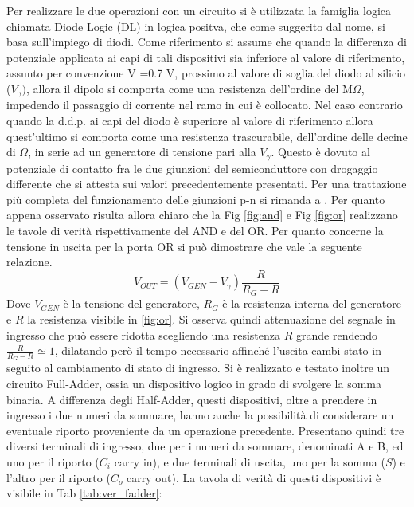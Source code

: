 \documentclass[a4paper,11pt]{article}
\begin{document}
	Per realizzare le due operazioni con un circuito si è utilizzata la famiglia logica chiamata Diode Logic (DL) in logica positva, che come suggerito dal nome, si basa sull'impiego di diodi. Come riferimento si assume che quando la differenza di potenziale applicata ai capi di tali dispositivi sia inferiore al valore di riferimento, assunto per convenzione V =0.7 V, prossimo al valore di soglia del diodo al silicio ($V_\gamma)$, allora   il dipolo si comporta come una resistenza dell'ordine del M$\Omega$, impedendo il passaggio di corrente nel ramo in cui è collocato. Nel caso contrario quando la d.d.p. ai capi del diodo è superiore al valore di riferimento allora quest'ultimo si comporta come una resistenza trascurabile, dell'ordine delle decine di $\Omega$, in serie ad un generatore di tensione pari alla $V_\gamma$. Questo è dovuto al potenziale di contatto fra le due giunzioni del semiconduttore con drogaggio differente che si attesta sui valori precedentemente presentati. Per una trattazione più completa del funzionamento delle giunzioni p-n si rimanda a \cite{6773080}. Per quanto appena osservato risulta allora chiaro che la Fig \ref{fig:and} e Fig \ref{fig:or} realizzano le tavole di verità rispettivamente del AND e del OR.
	Per quanto concerne la tensione in uscita per la porta OR si può dimostrare che vale la seguente relazione.
	\begin{equation}
		V_{OUT} = (V_{GEN}- V_\gamma) \frac{R}{R_G-R}
		\label{eq:v_out}
	\end{equation}
	Dove $V_{GEN}$ è la tensione del generatore, $R_G$ è la resistenza interna del generatore e $R$ la resistenza visibile in \ref{fig:or}. Si osserva quindi attenuazione del segnale in ingresso che può essere ridotta scegliendo una resistenza $R$ grande rendendo $\frac{R}{R_G-R} \simeq1$, dilatando però il tempo necessario affinché l'uscita cambi stato in seguito al cambiamento di stato di ingresso.
	Si è realizzato e testato inoltre un circuito Full-Adder, ossia un dispositivo logico in grado di svolgere la somma binaria. A differenza degli Half-Adder, questi dispositivi, oltre a prendere in ingresso i due numeri da sommare, hanno anche la possibilità di considerare un eventuale riporto proveniente da un operazione precedente. Presentano quindi tre diversi terminali di ingresso, due per i numeri da sommare, denominati A e B, ed uno per il riporto ($C_i$ carry in), e due terminali di uscita, uno per la somma ($S$) e l'altro per il riporto ($C_o$ carry out). La tavola di verità di questi dispositivi è visibile in Tab \ref{tab:ver_fadder}:
\end{document}

